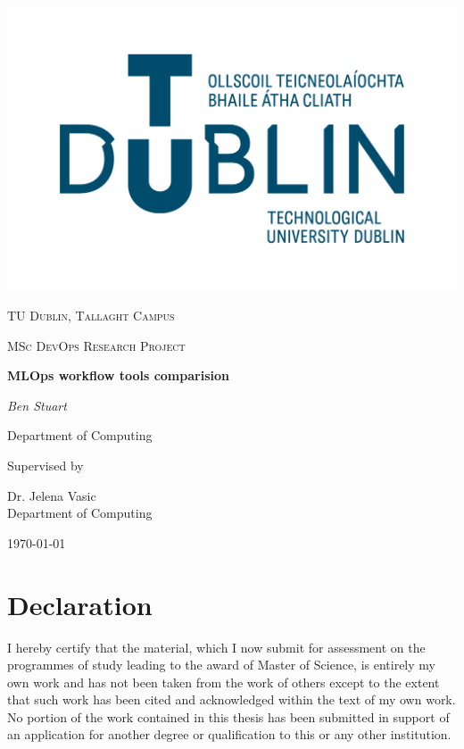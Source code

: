 \documentclass[12pt]{article}
\begin{document}
\thispagestyle{empty}
\setlength\headheight{0pt} 
\begin{center}

\begin{center}
\includegraphics[width=0.65\linewidth]{images/TUD_Logo.png}            
\end{center}	

        \vspace{0.25cm}
        {\scshape\LARGE TU Dublin, Tallaght Campus \par}
        \vspace{0.25cm}
        {\scshape\Large MSc DevOps Research Project\par}
        \vspace{0.5cm}

        {\Large\bfseries MLOps workflow tools comparision\par}
        
        \vspace{0.5cm}
        {\Large\itshape Ben Stuart\par}
        Department of Computing
        \vspace{0.25cm}

\vspace{1cm}
Supervised by\par
Dr. Jelena Vasic\\
Department of Computing\par
\vspace{1.5cm}
\large
\today

\end{center}

\clearpage
\restoregeometry
\justify

\section*{Declaration}
I hereby certify that the material, which I now submit for assessment on the programmes of study leading to the award of Master of Science, is entirely my own work and has not been taken from the work of others except to the extent that such work has been cited and acknowledged within the text of my own work. No portion of the work contained in this thesis has been submitted in support of an application for another degree or qualification to this or any other institution.
\end{document}

